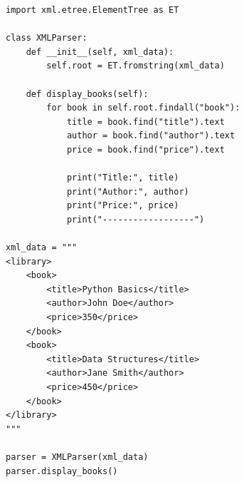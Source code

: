 \begin{verbatim}
import xml.etree.ElementTree as ET

class XMLParser:
    def __init__(self, xml_data):
        self.root = ET.fromstring(xml_data)

    def display_books(self):
        for book in self.root.findall("book"):
            title = book.find("title").text
            author = book.find("author").text
            price = book.find("price").text

            print("Title:", title)
            print("Author:", author)
            print("Price:", price)
            print("------------------")

xml_data = """
<library>
    <book>
        <title>Python Basics</title>
        <author>John Doe</author>
        <price>350</price>
    </book>
    <book>
        <title>Data Structures</title>
        <author>Jane Smith</author>
        <price>450</price>
    </book>
</library>
"""

parser = XMLParser(xml_data)
parser.display_books()
\end{verbatim}